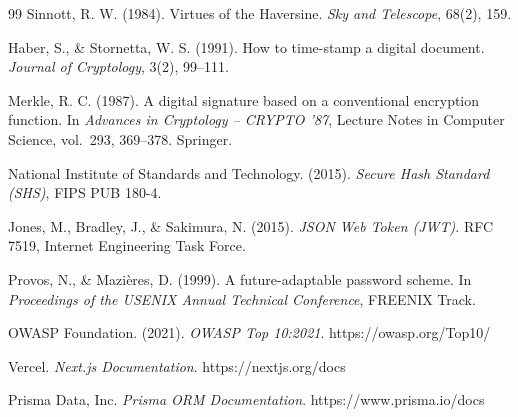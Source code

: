\begin{thebibliography}{99}
 Sinnott, R. W. (1984). Virtues of the Haversine. \emph{Sky and Telescope}, 68(2), 159.

 Haber, S., \& Stornetta, W. S. (1991). How to time-stamp a digital document. \emph{Journal of Cryptology}, 3(2), 99--111.

 Merkle, R. C. (1987). A digital signature based on a conventional encryption function. In \emph{Advances in Cryptology -- CRYPTO '87}, Lecture Notes in Computer Science, vol.~293, 369--378. Springer.

 National Institute of Standards and Technology. (2015). \emph{Secure Hash Standard (SHS)}, FIPS PUB 180-4.

 Jones, M., Bradley, J., \& Sakimura, N. (2015). \emph{JSON Web Token (JWT)}. RFC 7519, Internet Engineering Task Force.

 Provos, N., \& Mazi\`eres, D. (1999). A future-adaptable password scheme. In \emph{Proceedings of the USENIX Annual Technical Conference}, FREENIX Track.

 OWASP Foundation. (2021). \emph{OWASP Top 10:2021}. https://owasp.org/Top10/

 Vercel. \emph{Next.js Documentation}. https://nextjs.org/docs

 Prisma Data, Inc. \emph{Prisma ORM Documentation}. https://www.prisma.io/docs

\end{thebibliography}
